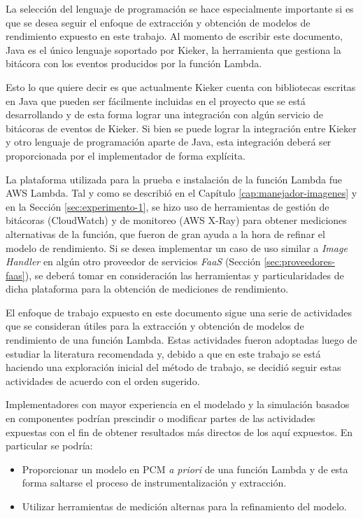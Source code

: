 La selección del lenguaje de programación se hace especialmente importante si es que se desea seguir el enfoque de extracción y obtención de modelos de rendimiento expuesto en este trabajo. Al momento de escribir este documento, Java es el único lenguaje soportado por Kieker, la herramienta que gestiona la bitácora con los eventos producidos por la función Lambda.

Esto lo que quiere decir es que actualmente Kieker cuenta con bibliotecas escritas en Java que pueden ser fácilmente incluidas en el proyecto que se está desarrollando y de esta forma lograr una integración con algún servicio de bitácoras de eventos de Kieker. Si bien se puede lograr la integración entre Kieker y otro lenguaje de programación aparte de Java, esta integración deberá ser proporcionada por el implementador de forma explícita. 

La plataforma utilizada para la prueba e instalación de la función Lambda fue AWS Lambda. Tal y como se describió en el Capítulo \ref{cap:manejador-imagenes} y en la Sección \ref{sec:experimento-1}, se hizo uso de herramientas de gestión de bitácoras (CloudWatch) y de monitoreo (AWS X-Ray) para obtener mediciones alternativas de la función, que fueron de gran ayuda a la hora de refinar el modelo de rendimiento. Si se desea implementar un caso de uso similar a \emph{Image Handler} en algún otro proveedor de servicios \emph{FaaS} (Sección \ref{sec:proveedores-faas}), se deberá  tomar en consideración las herramientas y particularidades de dicha plataforma para la obtención de mediciones de rendimiento.

El enfoque de trabajo expuesto en este documento sigue una serie de actividades que se consideran útiles para la extracción y obtención de modelos de rendimiento de una función Lambda. Estas actividades fueron adoptadas luego de estudiar la literatura recomendada y, debido a que en este trabajo se está haciendo una exploración inicial del método de trabajo, se decidió seguir estas actividades de acuerdo con el orden sugerido.

Implementadores con mayor experiencia en el modelado y la simulación basados en componentes podrían prescindir o modificar partes de las actividades expuestas con el fin de obtener resultados más directos de los aquí expuestos. En particular se podría:
\begin{itemize}
    \item Proporcionar un modelo en PCM \emph{a priori} de una función Lambda y de esta forma saltarse el proceso de instrumentalización y extracción.
    \item Utilizar herramientas de medición alternas para la refinamiento del modelo.
\end{itemize}

